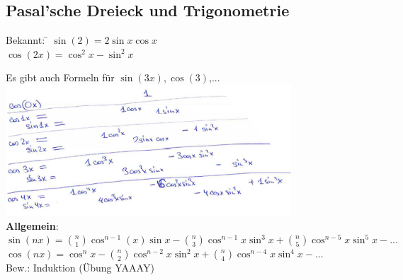\subsection{ Pasal'sche Dreieck und Trigonometrie}
\begin{tabbing}
	Bekannt: \= $\sin(2) = 2\sin x \cos x$\\
	\> $\cos(2x)=\cos^2x-\sin^2x$
\end{tabbing}
Es gibt auch Formeln für $\sin(3x) , \cos(3)$,...\smallskip\\
\includegraphics[width=0.8\textwidth]{img/ayy.PNG}\medskip\\
\textbf{Allgemein}:\\
$\sin(nx) = \binom{n}{1}\cos^{n-1}(x) \sin x - \binom{n}{3}\cos^{n-1}x \sin^3x + \binom{n}{5} \cos^{n-5}x \sin^5x-...$\medskip\\
$\cos(nx) = \cos^nx - \binom{n}{2}\cos^{n-2}x\sin^2x+\binom{n}{4}\cos^{n-4}x\sin^4x-...$\medskip\\
Bew.: Induktion (Übung YAAAY)
